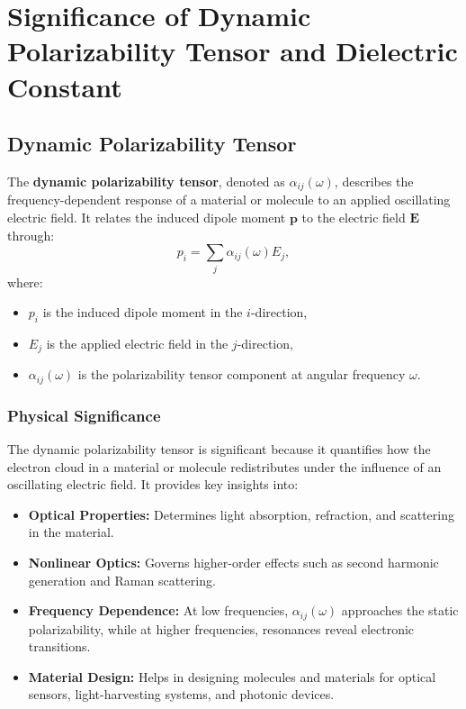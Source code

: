 \documentclass[12pt]{article}
\begin{document}
\section*{Significance of Dynamic Polarizability Tensor and Dielectric Constant}

\subsection*{Dynamic Polarizability Tensor}

The \textbf{dynamic polarizability tensor}, denoted as $\alpha_{ij}(\omega)$, describes the frequency-dependent response of a material or molecule to an applied oscillating electric field. It relates the induced dipole moment $\mathbf{p}$ to the electric field $\mathbf{E}$ through:
\[
p_i = \sum_{j} \alpha_{ij}(\omega) E_j,
\]
where:
\begin{itemize}
    \item $p_i$ is the induced dipole moment in the $i$-direction,
    \item $E_j$ is the applied electric field in the $j$-direction,
    \item $\alpha_{ij}(\omega)$ is the polarizability tensor component at angular frequency $\omega$.
\end{itemize}

\subsubsection*{Physical Significance}
The dynamic polarizability tensor is significant because it quantifies how the electron cloud in a material or molecule redistributes under the influence of an oscillating electric field. It provides key insights into:
\begin{itemize}
    \item \textbf{Optical Properties:} Determines light absorption, refraction, and scattering in the material.
    \item \textbf{Nonlinear Optics:} Governs higher-order effects such as second harmonic generation and Raman scattering.
    \item \textbf{Frequency Dependence:} At low frequencies, $\alpha_{ij}(\omega)$ approaches the static polarizability, while at higher frequencies, resonances reveal electronic transitions.
    \item \textbf{Material Design:} Helps in designing molecules and materials for optical sensors, light-harvesting systems, and photonic devices.
\end{itemize}
\end{document}
